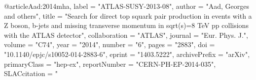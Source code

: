 @article{Aad:2014mha,
      label          = "ATLAS-SUSY-2013-08",
      author         = "Aad, Georges and others",
      title          = "{Search for direct top squark pair production in events
                        with a Z boson, b-jets and missing transverse momentum in
                        sqrt(s)=8 TeV pp collisions with the ATLAS detector}",
      collaboration  = "ATLAS",
      journal        = "Eur. Phys. J.",
      volume         = "C74",
      year           = "2014",
      number         = "6",
      pages          = "2883",
      doi            = "10.1140/epjc/s10052-014-2883-6",
      eprint         = "1403.5222",
      archivePrefix  = "arXiv",
      primaryClass   = "hep-ex",
      reportNumber   = "CERN-PH-EP-2014-035",
      SLACcitation   = "%
}

